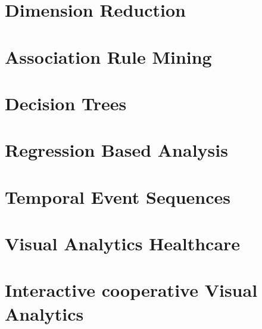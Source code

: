 \documentclass[11pt,ngerman]{article}
\begin{document}

\section{Dimension Reduction}


\section{Association Rule Mining}


\section{Decision Trees}


\section{Regression Based Analysis}


\section{Temporal Event Sequences}


\section{Visual Analytics Healthcare}


\section{Interactive cooperative Visual Analytics}
\end{document}

